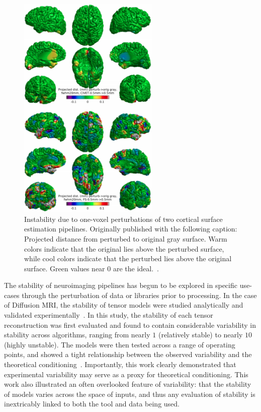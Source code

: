 \begin{figure}[b!]
\centering
\includegraphics[width=0.6\textwidth]{./figs/onevoxel_civetfs.png}
\caption[Instability due to one-voxel perturbations]{Instability due to one-voxel perturbations of two cortical surface
estimation pipelines. Originally published with the following caption: Projected distance from perturbed to original
gray surface. Warm colors indicate that the original lies above the perturbed surface, while cool colors indicate that
the perturbed lies above the original surface. Green values near 0 are the ideal.~\cite{Lewis2017-ll}.}
\label{fig:onevox_cortical}
\end{figure}

The stability of neuroimaging pipelines has begun to be explored in specific use-cases through the perturbation of data
or libraries prior to processing. In the case of Diffusion MRI, the stability of tensor models were studied
analytically and validated experimentally~\cite{skare2000condition}. In this study, the stability of each tensor
reconstruction was first evaluated and found to contain considerable variability in stability across algorithms, ranging
from nearly $1$ (relatively stable) to nearly $10$ (highly unstable). The models were then tested across a range of
operating points, and showed a tight relationship between the observed variability and the theoretical
conditioning~\cite{skare2000condition}. Importantly, this work clearly demonstrated that experimental variability may
serve as a proxy for theoretical conditioning. This work also illustrated an often overlooked feature of variability: that
the stability of models varies across the space of inputs, and thus any evaluation of stability is inextricably linked to
both the tool and data being used.


